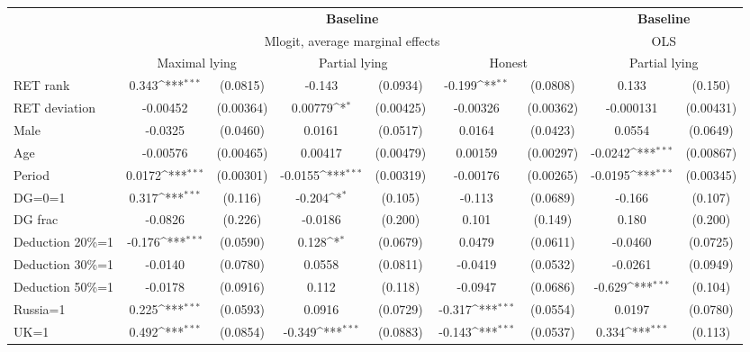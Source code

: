 \def\sym#1{\ifmmode^{#1}\else\(^{#1}\)\fi}
\begin{tabular}{l|cccccc|cc}
\hline\hline
&\multicolumn{6}{c|}{\bf Baseline}&\multicolumn{2}{c}{\bf Baseline}\\ &\multicolumn{6}{c|}{Mlogit, average marginal effects }&\multicolumn{2}{c}{OLS}\\
                &\multicolumn{2}{c}{Maximal lying}&\multicolumn{2}{c}{Partial lying}&\multicolumn{2}{c}{Honest}  &\multicolumn{2}{c}{Partial lying}\\
\hline
RET rank        &    0.343\sym{***}& (0.0815)&   -0.143         & (0.0934)&   -0.199\sym{**} & (0.0808)&    0.133         &  (0.150)\\
RET deviation   & -0.00452         &(0.00364)&  0.00779\sym{*}  &(0.00425)& -0.00326         &(0.00362)&-0.000131         &(0.00431)\\
Male            &  -0.0325         & (0.0460)&   0.0161         & (0.0517)&   0.0164         & (0.0423)&   0.0554         & (0.0649)\\
Age             & -0.00576         &(0.00465)&  0.00417         &(0.00479)&  0.00159         &(0.00297)&  -0.0242\sym{***}&(0.00867)\\
Period          &   0.0172\sym{***}&(0.00301)&  -0.0155\sym{***}&(0.00319)& -0.00176         &(0.00265)&  -0.0195\sym{***}&(0.00345)\\
DG=0=1          &    0.317\sym{***}&  (0.116)&   -0.204\sym{*}  &  (0.105)&   -0.113         & (0.0689)&   -0.166         &  (0.107)\\
DG frac         &  -0.0826         &  (0.226)&  -0.0186         &  (0.200)&    0.101         &  (0.149)&    0.180         &  (0.200)\\
Deduction 20\%=1&   -0.176\sym{***}& (0.0590)&    0.128\sym{*}  & (0.0679)&   0.0479         & (0.0611)&  -0.0460         & (0.0725)\\
Deduction 30\%=1&  -0.0140         & (0.0780)&   0.0558         & (0.0811)&  -0.0419         & (0.0532)&  -0.0261         & (0.0949)\\
Deduction 50\%=1&  -0.0178         & (0.0916)&    0.112         &  (0.118)&  -0.0947         & (0.0686)&   -0.629\sym{***}&  (0.104)\\
Russia=1        &    0.225\sym{***}& (0.0593)&   0.0916         & (0.0729)&   -0.317\sym{***}& (0.0554)&   0.0197         & (0.0780)\\
UK=1            &    0.492\sym{***}& (0.0854)&   -0.349\sym{***}& (0.0883)&   -0.143\sym{***}& (0.0537)&    0.334\sym{***}&  (0.113)\\

\end{tabular}
